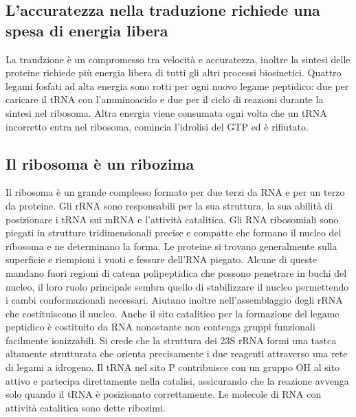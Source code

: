 \subsection{L'accuratezza nella traduzione richiede una spesa di energia libera}
La traudzione \`e un compromesso tra velocit\`a e accuratezza, inoltre la sintesi delle proteine richiede pi\`u energia libera di tutti gli altri processi biosinetici. Quattro legami
fosfati ad alta energia sono rotti per ogni nuovo legame peptidico: due per caricare il tRNA con l'amminoacido e due per il ciclo di reazioni durante la sintesi nel ribosoma. Altra
energia viene consumata ogni volta che un tRNA incorretto entra nel ribosoma, comincia l'idrolisi del GTP ed \`e rifiutato. 
\subsection{Il ribosoma \`e un ribozima}
Il ribosoma \`e un grande complesso formato per due terzi da RNA e per un terzo da proteine. Gli rRNA sono responsabili per la sua struttura, la sua abilit\`a di posizionare i tRNA sui 
mRNA e l'attivit\`a catalitica. Gli RNA ribosomiali sono piegati in strutture tridimensionali precise e compatte che formano il nucleo del ribosoma e ne determinano la forma. Le proteine
si trovano generalmente sulla superficie e riempioni i vuoti e fessure dell'RNA piegato. Alcune di queste mandano fuori regioni di catena polipeptidica che possono penetrare in buchi 
del nucleo, il loro ruolo principale sembra quello di stabilizzare il nucleo permettendo i cambi conformazionali necessari. Aiutano inoltre nell'assemblaggio degli rRNA che costituiscono
il nucleo. Anche il sito catalitico per la formazione del legame peptidico \`e costituito da RNA nonostante non contenga gruppi funzionali facilmente ionizzabili. Si crede che la 
struttura dei 23S rRNA formi una tastca altamente strutturata che orienta precisamente i due reagenti attraverso una rete di legami a idrogeno. Il tRNA nel sito P contribuisce con un
gruppo OH al sito attivo e partecipa direttamente nella catalisi, assicurando che la reazione avvenga solo quando il tRNA \`e posizionato correttamente. Le molecole di RNA con attivit\`a
catalitica sono dette ribozimi. 
